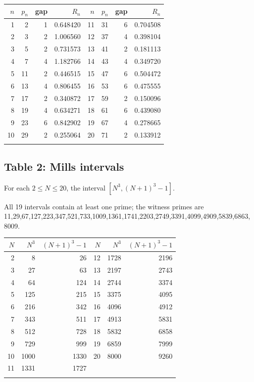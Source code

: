 \documentclass[11pt,reqno]{amsart}
\theoremstyle{redplain}
\numberwithin{equation}{section}
\begin{document}
\begin{center}
\begin{tabular}{rrrr|rrrr}
\toprule $n$ & $p_n$ & gap & $R_n$ & $n$ & $p_n$ & gap & $R_n$ \\ 
\midrule 1 & 2 & 1 & 0.648420 & 11 & 31 & 6 & 0.704508 \\ 
2 & 3 & 2 & 1.006560 & 12 & 37 & 4 & 0.398104 \\ 
3 & 5 & 2 & 0.731573 & 13 & 41 & 2 & 0.181113 \\ 
4 & 7 & 4 & 1.182766 & 14 & 43 & 4 & 0.349720 \\ 
5 & 11 & 2 & 0.446515 & 15 & 47 & 6 & 0.504472 \\ 
6 & 13 & 4 & 0.806455 & 16 & 53 & 6 & 0.475555 \\ 
7 & 17 & 2 & 0.340872 & 17 & 59 & 2 & 0.150096 \\ 
8 & 19 & 4 & 0.634271 & 18 & 61 & 6 & 0.439080 \\ 
9 & 23 & 6 & 0.842902 & 19 & 67 & 4 & 0.278665 \\ 
10 & 29 & 2 & 0.255064 & 20 & 71 & 2 & 0.133912 \\ 
\bottomrule &  &  &  &  &  &  & 
\end{tabular}
\end{center}

\subsection{Table 2: Mills intervals}

\noindent%
For each $2\leq N\leq 20$, the interval $[N^{3},(N+1)^{3}-1]$.

\noindent%
All 19 intervals contain at least one prime; the witness primes are
11,29,67,127,223,347,521,733,1009,1361,1741,2203,2749,3391,4099,4909,5839,6863,8009.

\begin{center}
\begin{tabular}{rrr|rrr}
\toprule $N$ & $N^3$ & $(N+1)^3-1$ & $N$ & $N^3$ & $(N+1)^3-1$ \\ 
\midrule 2 & 8 & 26 & 12 & 1728 & 2196 \\ 
3 & 27 & 63 & 13 & 2197 & 2743 \\ 
4 & 64 & 124 & 14 & 2744 & 3374 \\ 
5 & 125 & 215 & 15 & 3375 & 4095 \\ 
6 & 216 & 342 & 16 & 4096 & 4912 \\ 
7 & 343 & 511 & 17 & 4913 & 5831 \\ 
8 & 512 & 728 & 18 & 5832 & 6858 \\ 
9 & 729 & 999 & 19 & 6859 & 7999 \\ 
10 & 1000 & 1330 & 20 & 8000 & 9260 \\ 
11 & 1331 & 1727 &  &  &  \\ 
\bottomrule &  &  &  &  & 
\end{tabular}
\end{center}
\end{document}
